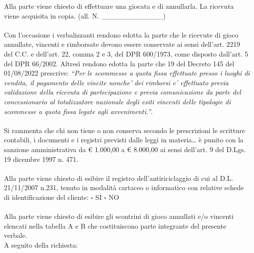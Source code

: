 \documentclass[12pt]{article}
\begin{document}
Alla parte viene chiesto di effettuare una giocata e di annullarla. La ricevuta viene acquisita in copia. (all. N. \_\_\_\_\_\_\_\_\_\_\_\_)
\\\\
Con l’occasione i verbalizzanti rendono edotta la parte che le ricevute di gioco annullate, vincenti e rimborsate devono essere conservate ai sensi dell'art. 2219 del C.C. e dell'art. 22, comma 2 e 3, del DPR 600/1973, come disposto dall’art. 5 del DPR 66/2002. Altresì  rendono edotta la parte che 19 del Decreto 145 del 01/08/2022 prescrive: \textit{“Per le scommesse a quota fissa effettuate presso i luoghi di vendita, il pagamento delle vincite nonche' dei rimborsi e' effettuato previa validazione della ricevuta di partecipazione e previa comunicazione da parte del concessionario al totalizzatore
nazionale degli esiti vincenti delle tipologie di scommesse a quota fissa legate agli avvenimenti.”}.
\\\\
Si rammenta che chi non tiene o non conserva secondo le prescrizioni le scritture contabili, i documenti e i registri previsti dalle leggi in materia… è punito con la sanzione amministrativa da € 1.000,00 a € 8.000,00 ai sensi dell’art. 9 del D.Lgs. 19 dicembre 1997 n. 471.
\\\\
Alla parte viene chiesto di esibire il registro dell’antiriciclaggio di cui al D.L. 21/11/2007 n.231, tenuto in modalità cartaceo o informatico con relative schede di identificazione del cliente: \begin{math}\square\end{math} SI \begin{math}\square\end{math} NO
\\\\
Alla parte viene chiesto di esibire gli scontrini di gioco annullati e/o vincenti elencati nella tabella  A e B che costituiscono parte integrante del presente verbale. \\
A seguito della richiesta:
\end{document}
